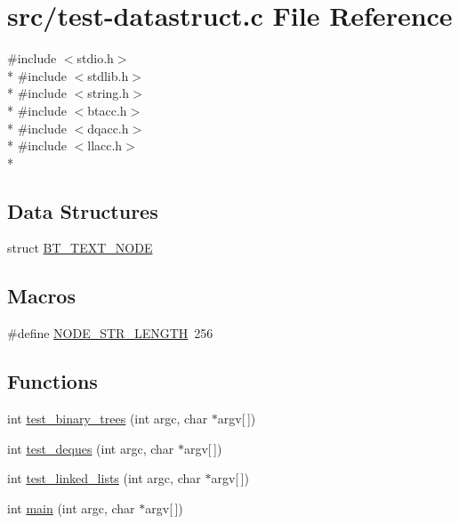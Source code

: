 \hypertarget{test-datastruct_8c}{\section{src/test-\/datastruct.c File Reference}
\label{test-datastruct_8c}
}
{\ttfamily \#include $<$stdio.\-h$>$}\\*
{\ttfamily \#include $<$stdlib.\-h$>$}\\*
{\ttfamily \#include $<$string.\-h$>$}\\*
{\ttfamily \#include $<$btacc.\-h$>$}\\*
{\ttfamily \#include $<$dqacc.\-h$>$}\\*
{\ttfamily \#include $<$llacc.\-h$>$}\\*
\subsection*{Data Structures}
\begin{DoxyCompactItemize}
\item 
struct \hyperlink{struct_b_t___t_e_x_t___n_o_d_e}{B\-T\-\_\-\-T\-E\-X\-T\-\_\-\-N\-O\-D\-E}
\end{DoxyCompactItemize}
\subsection*{Macros}
\begin{DoxyCompactItemize}
\item 
\#define \hyperlink{test-datastruct_8c_a255013a24c881be111ab757fc0a28dfb}{N\-O\-D\-E\-\_\-\-S\-T\-R\-\_\-\-L\-E\-N\-G\-T\-H}~256
\end{DoxyCompactItemize}
\subsection*{Functions}
\begin{DoxyCompactItemize}
\item 
int \hyperlink{test-datastruct_8c_ac717ee5022d0939ad083dfc44cb72724}{test\-\_\-binary\-\_\-trees} (int argc, char $\ast$argv\mbox{[}$\,$\mbox{]})
\item 
int \hyperlink{test-datastruct_8c_a509989bda83e82d1dbd5f07c545159ca}{test\-\_\-deques} (int argc, char $\ast$argv\mbox{[}$\,$\mbox{]})
\item 
int \hyperlink{test-datastruct_8c_addc66d20e147853e95828fb8c9121e08}{test\-\_\-linked\-\_\-lists} (int argc, char $\ast$argv\mbox{[}$\,$\mbox{]})
\item 
int \hyperlink{test-datastruct_8c_a0ddf1224851353fc92bfbff6f499fa97}{main} (int argc, char $\ast$argv\mbox{[}$\,$\mbox{]})
\end{DoxyCompactItemize}


